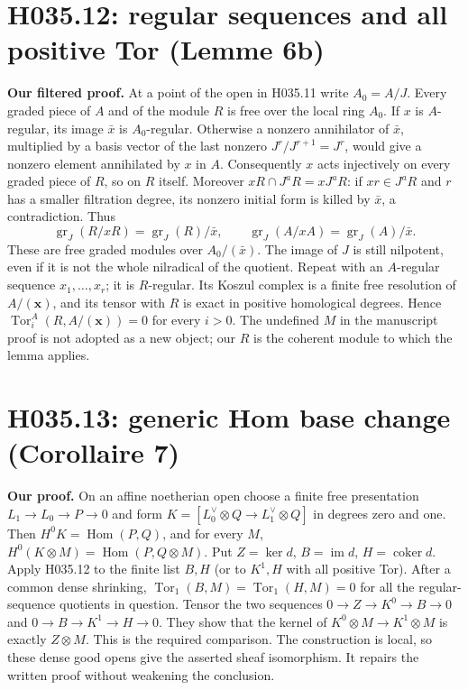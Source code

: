 \section{H035.12: regular sequences and all positive Tor (Lemme 6b)}
\textbf{Our filtered proof.} At a point of the open in H035.11 write
$A_0=A/J$. Every graded piece of $A$ and of the module $R$ is free over
the local ring $A_0$. If $x$ is $A$-regular, its image $\bar x$ is
$A_0$-regular. Otherwise a nonzero annihilator of $\bar x$, multiplied
by a basis vector of the last nonzero $J^r/J^{r+1}=J^r$, would give
a nonzero element annihilated by $x$ in $A$. Consequently $x$ acts
injectively on every graded piece of $R$, so on $R$ itself. Moreover
$xR\cap J^aR=xJ^aR$: if $xr\in J^aR$ and $r$ has a smaller
filtration degree, its nonzero initial form is killed by $\bar x$,
a contradiction. Thus
\[
 \operatorname{gr}_J(R/xR)=\operatorname{gr}_J(R)/\bar x,
 \qquad
 \operatorname{gr}_J(A/xA)=\operatorname{gr}_J(A)/\bar x.
\]
These are free graded modules over $A_0/(\bar x)$. The image of $J$
is still nilpotent, even if it is not the whole nilradical of the quotient.
Repeat with an $A$-regular sequence $x_1,\ldots,x_r$; it is $R$-regular.
Its Koszul complex is a finite free resolution of $A/(\mathbf x)$,
and its tensor with $R$ is exact in positive homological degrees.
Hence $\operatorname{Tor}_i^A(R,A/(\mathbf x))=0$ for every $i>0$.
The undefined $M$ in the manuscript proof is not adopted as a new object;
our $R$ is the coherent module to which the lemma applies.

\section{H035.13: generic Hom base change (Corollaire 7)}
\textbf{Our proof.} On an affine noetherian open choose a finite free
presentation $L_1\to L_0\to P\to0$ and form
$K=[L_0^\vee\otimes Q\to L_1^\vee\otimes Q]$ in degrees zero and
one. Then $H^0K=\operatorname{Hom}(P,Q)$, and for every $M$,
$H^0(K\otimes M)=\operatorname{Hom}(P,Q\otimes M)$. Put
$Z=\ker d$, $B=\operatorname{im}d$, $H=\operatorname{coker}d$.
Apply H035.12 to the finite list $B,H$ (or to $K^1,H$ with all positive
Tor). After a common dense shrinking,
$\operatorname{Tor}_1(B,M)=\operatorname{Tor}_1(H,M)=0$ for all
the regular-sequence quotients in question. Tensor the two sequences
$0\to Z\to K^0\to B\to0$ and
$0\to B\to K^1\to H\to0$. They show that the kernel of
$K^0\otimes M\to K^1\otimes M$ is exactly $Z\otimes M$.
This is the required comparison. The construction is local, so these
dense good opens give the asserted sheaf isomorphism. It repairs the
written proof without weakening the conclusion.

